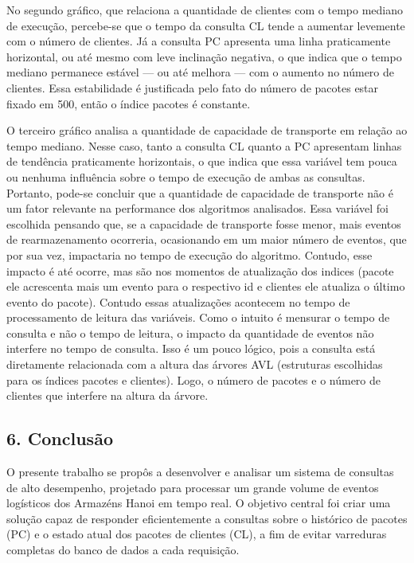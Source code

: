 \documentclass[
  12pt,
]{article}
\begin{document}
No segundo gráfico, que relaciona a quantidade de clientes com o tempo
mediano de execução, percebe-se que o tempo da consulta CL tende a
aumentar levemente com o número de clientes. Já a consulta PC apresenta
uma linha praticamente horizontal, ou até mesmo com leve inclinação
negativa, o que indica que o tempo mediano permanece estável --- ou até
melhora --- com o aumento no número de clientes. Essa estabilidade é
justificada pelo fato do número de pacotes estar fixado em 500, então o
índice pacotes é constante.

O terceiro gráfico analisa a quantidade de capacidade de transporte em
relação ao tempo mediano. Nesse caso, tanto a consulta CL quanto a PC
apresentam linhas de tendência praticamente horizontais, o que indica
que essa variável tem pouca ou nenhuma influência sobre o tempo de
execução de ambas as consultas. Portanto, pode-se concluir que a
quantidade de capacidade de transporte não é um fator relevante na
performance dos algoritmos analisados. Essa variável foi escolhida
pensando que, se a capacidade de transporte fosse menor, mais eventos de
rearmazenamento ocorreria, ocasionando em um maior número de eventos,
que por sua vez, impactaria no tempo de execução do algoritmo. Contudo,
esse impacto é até ocorre, mas são nos momentos de atualização dos
indices (pacote ele acrescenta mais um evento para o respectivo id e
clientes ele atualiza o último evento do pacote). Contudo essas
atualizações acontecem no tempo de processamento de leitura das
variáveis. Como o intuito é mensurar o tempo de consulta e não o tempo
de leitura, o impacto da quantidade de eventos não interfere no tempo de
consulta. Isso é um pouco lógico, pois a consulta está diretamente
relacionada com a altura das árvores AVL (estruturas escolhidas para os
índices pacotes e clientes). Logo, o número de pacotes e o número de
clientes que interfere na altura da árvore.

\newpage

\subsection{6. Conclusão}\label{conclusuxe3o}

O presente trabalho se propôs a desenvolver e analisar um sistema de
consultas de alto desempenho, projetado para processar um grande volume
de eventos logísticos dos Armazéns Hanoi em tempo real. O objetivo
central foi criar uma solução capaz de responder eficientemente a
consultas sobre o histórico de pacotes (PC) e o estado atual dos pacotes
de clientes (CL), a fim de evitar varreduras completas do banco de dados
a cada requisição.
\end{document}
